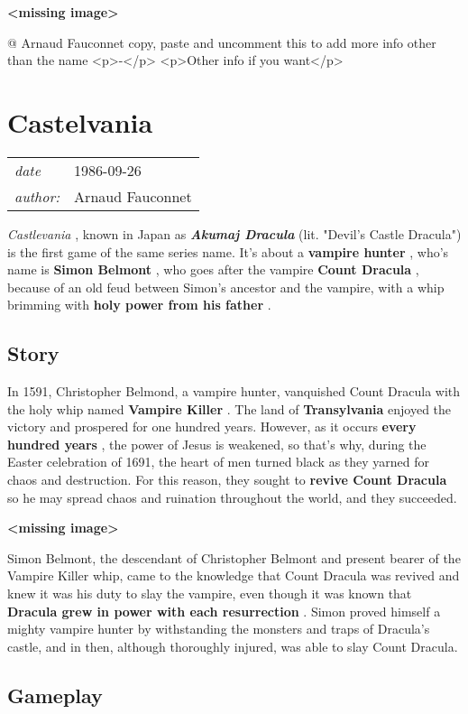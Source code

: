 \documentclass[a4paper,10pt]{book}
\newcommand{\pageHeader}[4]{
    \section{#1}
    \vspace{-0.3cm}
    \begin{table}[h!]
     \begin{tabular}{ll}
        \hline
        \textit{date} & #2 \\
        \textit{author: } & #3\\
        \hline
     \end{tabular}
    \end{table}
    \vspace{-0.3cm}
}
\begin{document}
 \textbf{<missing image>}
 
 
 @ Arnaud Fauconnet 
  copy, paste and uncomment this to add more info other than the name
                <p>-</p>
                <p>Other info if you want</p>
               
 
 \newpage\pageHeader{Castelvania}{1986-09-26}{Arnaud Fauconnet}{An action-adventure gothic horror video game series about vampire hunters.}
 
 \textit{Castlevania }, known in Japan as  \textit{\textbf{Akumaj Dracula } }
              (lit. "Devil's Castle Dracula") is the first game of the same series
              name. It's about a  \textbf{vampire hunter } , who's name is  \textbf{Simon Belmont } , who
              goes after the vampire  \textbf{Count Dracula } , because of an old feud between
              Simon's ancestor and the vampire, with a whip brimming with  \textbf{holy power
              from his father } . 
 \subsection{Story }
 In 1591, Christopher Belmond, a vampire hunter, vanquished Count
              Dracula with the holy whip named  \textbf{Vampire Killer } . The land of
               \textbf{Transylvania }  enjoyed the victory and prospered for one hundred years.
              However, as it occurs  \textbf{every hundred years } , the power of Jesus is
              weakened, so that's why, during the Easter celebration of 1691, the
              heart of men turned black as they yarned for chaos and destruction.
              For this reason, they sought to  \textbf{revive Count Dracula }  so he may spread
              chaos and ruination throughout the world, and they succeeded.
               
 
 
 \textbf{<missing image>}
 
 Simon Belmont, the descendant of Christopher Belmont and present
          bearer of the Vampire Killer whip, came to the knowledge that Count
          Dracula was revived and knew it was his duty to slay the vampire, even
          though it was known that  \textbf{Dracula grew in power with each
          resurrection } . Simon proved himself a mighty vampire hunter by
          withstanding the monsters and traps of Dracula's castle, and in then,
          although thoroughly injured, was able to slay Count Dracula. 
 \subsection{Gameplay }
 
\end{document}
